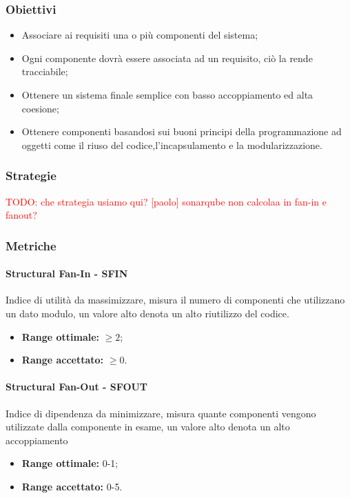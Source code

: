 		\subsubsection{Obiettivi}
		\begin{itemize}
			\item Associare ai requisiti una o più componenti del sistema;
			\item Ogni componente dovrà essere associata ad un requisito, ciò la rende tracciabile;
			\item Ottenere un sistema finale semplice con basso accoppiamento ed alta coesione;
			\item Ottenere componenti basandosi sui buoni principi della programmazione ad oggetti come il riuso del codice,l'incapsulamento e la modularizzazione.
		\end{itemize}
		\subsubsection{Strategie}
		\textcolor{red} {TODO: che strategia usiamo qui? [paolo] sonarqube non calcolaa in fan-in e fanout?}
		\subsubsection{Metriche}
			\paragraph{Structural Fan-In - SFIN} 
			Indice di utilità da massimizzare, misura il numero di componenti che utilizzano un dato modulo, un valore alto denota un alto riutilizzo del codice.
			\begin{itemize}
				\item \textbf{Range ottimale:} $\geq 2$;
				\item \textbf{Range accettato:} $\geq 0$.
			\end{itemize}
			\paragraph{Structural Fan-Out - SFOUT}
			Indice di dipendenza da minimizzare, misura quante componenti vengono utilizzate dalla componente in esame, un valore alto denota un alto accoppiamento
			\begin{itemize}
				\item \textbf{Range ottimale:} 0-1;
				\item \textbf{Range accettato:} 0-5.
			\end{itemize}
            


